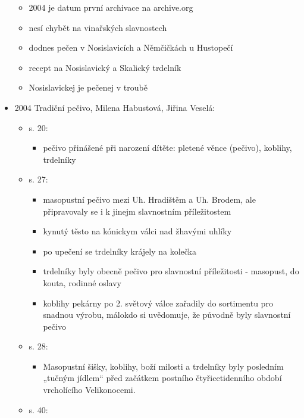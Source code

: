 \begin{itemize}
  \begin{itemize}
  \tightlist
  \item
    2004 je datum první archivace na archive.org
  \item
    nesí chybět na vinařských slavnostech
  \item
    dodnes pečen v Nosislavicích a Němčičkách u Hustopečí
  \item
    recept na Nosislavický a Skalický trdelník
  \item
    Nosislavickej je pečenej v troubě
  \end{itemize}
\item
  2004 Tradiční pečivo, Milena Habustová, Jiřina Veselá:

  \begin{itemize}
  \tightlist
  \item
    s. 20:

    \begin{itemize}
    \tightlist
    \item
      pečivo přinášené při narození dítěte: pletené věnce (pečivo),
      koblihy, trdelníky
    \end{itemize}
  \item
    s. 27:

    \begin{itemize}
    \tightlist
    \item
      masopustní pečivo mezi Uh. Hradištěm a Uh. Brodem, ale
      připravovaly se i k jinejm slavnostním příležitostem
    \item
      kynutý těsto na kónickym válci nad žhavými uhlíky
    \item
      po upečení se trdelníky krájely na kolečka
    \item
      trdelníky byly obecně pečivo pro slavnostní příležitosti -
      masopust, do kouta, rodinné oslavy
    \item
      koblihy pekárny po 2. světový válce zařadily do sortimentu pro
      snadnou výrobu, málokdo si uvědomuje, že původně byly slavnostní
      pečivo
    \end{itemize}
  \item
    s. 28:

    \begin{itemize}
    \tightlist
    \item
      Masopustní šišky, koblihy, boží milosti a trdelníky byly posledním
      „tučným jídlem`` před začátkem postního čtyřicetidenního období
      vrcholícího Velikonocemi.
    \end{itemize}
  \item
    s. 40:


\end{itemize}
\end{itemize}
